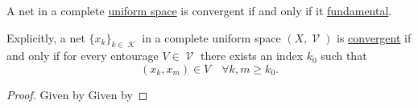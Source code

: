 \begin{theorem}\label{thm:cauchys_net_convergence_criterion}
  A net in a complete \hyperref[def:complete_uniform_space]{uniform space} is convergent if and only if it \hyperref[def:fundamental_net]{fundamental}.

  Explicitly, a net \( \{ x_k \}_{k \in \mscrK} \) in a complete uniform space \( (X, \mscrV) \) is \hyperref[def:net_convergence/limit]{convergent} if and only if for every entourage \( V \in \mscrV \) there exists an index \( k_0 \) such that
  \begin{equation*}
    (x_k, x_m) \in V \quad\forall k, m \geq k_0.
  \end{equation*}
\end{theorem}
\begin{proof}
  \SufficiencySubProof Given by 
  \NecessitySubProof Given by 
\end{proof}
